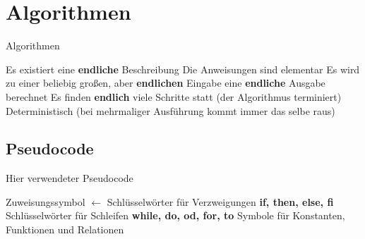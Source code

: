 \documentclass{beamer}
\begin{document}

\begin{frame}
	\titlepage
\end{frame}

\section{Algorithmen}
\begin{frame}{Algorithmen}
	\begin{itemize}
		\pitem Es existiert eine \textbf{endliche} Beschreibung
		\pitem Die Anweisungen sind elementar
		\pitem Es wird zu einer beliebig großen, aber \textbf{endlichen} Eingabe eine \textbf{endliche} Ausgabe berechnet
		\pitem Es finden \textbf{endlich} viele Schritte statt (der Algorithmus terminiert)
		\pitem Deterministisch (bei mehrmaliger Ausführung kommt immer das selbe raus)
	\end{itemize}
\end{frame}

\subsection{Pseudocode}
\begin{frame}{Hier verwendeter Pseudocode}
	\begin{itemize}
		\pitem Zuweisungssymbol $\leftarrow$
		\pitem Schlüsselwörter für Verzweigungen \textbf{if, then, else, fi}
		\pitem Schlüsselwörter für Schleifen \textbf{while, do, od, for, to}
		\pitem Symbole für Konstanten, Funktionen und Relationen
	\end{itemize}
\end{frame}
\end{document}
